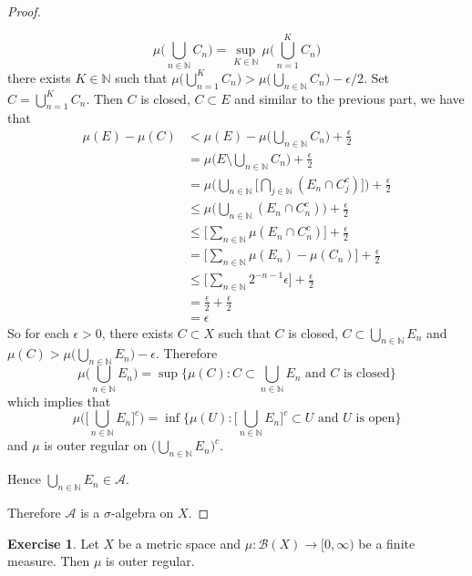 \documentclass{book}
\theoremstyle{definition}
\newtheorem{ex}[definition]{Exercise}
\newcommand{\ep}{\epsilon}
\newcommand{\sig}{\sigma}
\newcommand{\N}{\mathbb{N}}
\newcommand{\MA}{\mathcal{A}}
\newcommand{\MB}{\mathcal{B}}
\DeclareMathOperator*{\0}{\mbf{0}}
\DeclareMathOperator*{\1}{\mbf{1}}
\newcommand{\Rg}{[0,\infty)}
\begin{document}
\begin{proof}
\begin{enumerate}
\begin{itemize}
				$$\mu\bigg( \bigcup\limits_{n \in \N}C_n \bigg) = \sup\limits_{K \in \N} \mu\bigg(\bigcup\limits_{n=1}^K C_n \bigg)$$ 
				there exists $K \in \N$ such that $\mu\bigg(\bigcup\limits_{n=1}^K C_n \bigg) > \mu\bigg( \bigcup\limits_{n \in \N}C_n \bigg) - \ep/2 $. Set $C = \bigcup\limits_{n=1}^K C_n$.
				Then $C$ is closed, $C \subset E$ and similar to the previous part, we have that
				\begin{align*}
					\mu(E) - \mu(C)
					& < \mu(E) - \mu\bigg( \bigcup\limits_{n \in \N}C_n \bigg) + \frac{\ep}{2} \\
					&= \mu \bigg(E \setminus \bigcup\limits_{n \in \N}C_n   \bigg) +  \frac{\ep}{2} \\
					&= \mu \bigg( \bigcup\limits_{n \in \N} \bigg[ \bigcap_{j \in \N} (E_n \cap C_j^c)    \bigg] \bigg)  + \frac{\ep}{2} \\
					&\leq  \mu \bigg( \bigcup\limits_{n \in \N}  (E_n \cap C_n^c)  \bigg)  + \frac{\ep}{2} \\
					&\leq \bigg[ \sum_{n \in \N} \mu(E_n \cap C_n^c) \bigg] + \frac{\ep}{2}\\
					&=\bigg[ \sum_{n \in \N} \mu(E_n) - \mu(C_n) \bigg] +\frac{\ep}{2}\\
					&\leq \bigg[ \sum_{n \in \N} 2^{-n-1}\ep \bigg] + \frac{\ep}{2}\\
					&= \frac{\ep}{2} + \frac{\ep}{2} \\
					&= \ep 
				\end{align*}
				So for each $\ep >0$, there exists $C \subset X$ such that $C$ is closed, $C \subset \bigcup_{n \in \N}E_n$ and $\mu(C) > \mu \bigg( \bigcup_{n \in \N} E_n \bigg) - \ep$. Therefore 
				$$\mu \bigg( \bigcup_{n \in \N} E_n \bigg) = \sup \bigg \{ \mu(C): C \subset \bigcup_{n \in \N} E_n  \text{ and $C$ is closed} \bigg \}$$
				which implies that 
				$$\mu \bigg( \bigg[ \bigcup_{n \in \N} E_n \bigg]^c \bigg) = \inf \bigg \{ \mu(U): \bigg[ \bigcup_{n \in \N} E_n \bigg]^c \subset U  \text{ and $U$ is open} \bigg \}$$
				and $\mu$ is outer regular on $\bigg( \bigcup\limits_{n \in \N} E_n \bigg)^c$.
			\end{itemize}
		Hence $\bigcup\limits_{n \in \N} E_n \in \MA$.
		\end{enumerate}
	Therefore $\MA$ is a $\sig$-algebra on $X$.
	\end{proof}

	\begin{ex}
		Let $X$ be a metric space and $\mu: \MB(X) \rightarrow \Rg$ be a finite measure. Then $\mu$ is outer regular.
	\end{ex}
\end{document}
